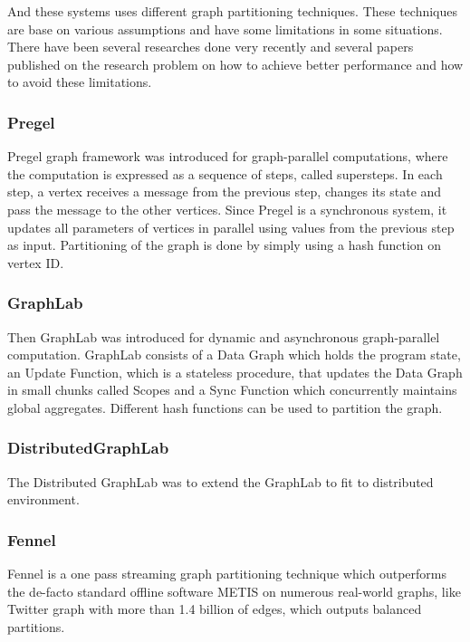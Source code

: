 \documentclass[12pt]{article}
\begin{document}
And these systems uses different graph partitioning techniques. These techniques are base on various assumptions and have some limitations in some situations. There have been several researches done very recently and several papers published on the research problem on how to achieve better performance and how to avoid these limitations. 

\subsubsection{Pregel}

Pregel\cite{Pregel} graph framework was introduced for graph-parallel computations, where the computation is expressed as a sequence of steps, called supersteps. In each step, a vertex receives a message from the previous step, changes its state and pass the message to the other vertices. Since Pregel is a synchronous system, it updates all parameters of vertices in parallel using values from the previous step as input. Partitioning of the graph is done by simply using a hash function on vertex ID. 

\subsubsection{GraphLab}

Then GraphLab\cite{Graphlab} \cite{DistributedGraphLab} was introduced for dynamic and asynchronous graph-parallel computation. GraphLab consists of a Data Graph which holds the program state, an Update Function, which is a stateless procedure, that updates the Data Graph in small chunks called Scopes and a Sync Function which concurrently maintains global aggregates. Different hash functions can be used to partition the graph. 

\subsubsection{DistributedGraphLab}

The Distributed GraphLab \cite{DistributedGraphLab} was to extend the GraphLab to fit to distributed environment. 

\subsubsection{Fennel}
Fennel \cite{Fennel} is a one pass streaming graph partitioning technique which outperforms the de-facto standard offline software METIS on numerous real-world graphs, like Twitter graph with more than 1.4 billion of edges, which outputs balanced partitions. 
\end{document}
